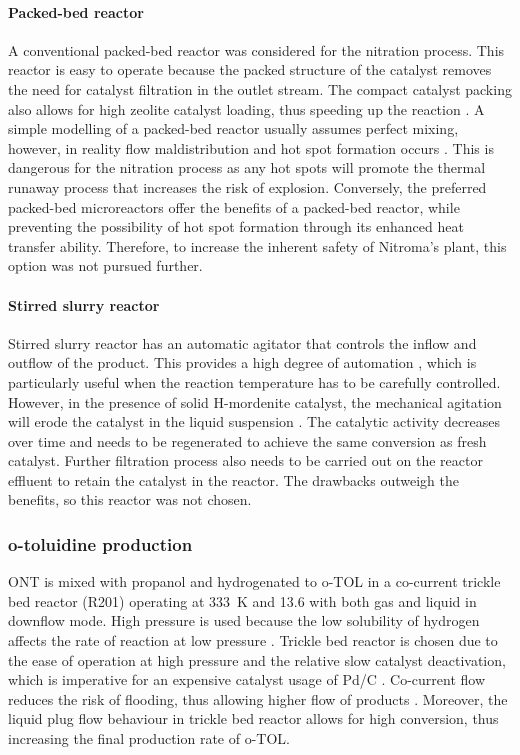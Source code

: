 \paragraph{Packed-bed reactor}
A conventional packed-bed reactor was considered for the nitration process. This reactor is easy to operate because the packed structure of the catalyst removes the need for catalyst filtration in the outlet stream. The compact catalyst packing also allows for high zeolite catalyst loading, thus speeding up the reaction \cite{kashid_microstructured_2009}. A simple modelling of a packed-bed reactor usually assumes perfect mixing, however, in reality flow maldistribution and hot spot formation occurs \cite{nguyen_flow_1994}. This is dangerous for the nitration process as any hot spots will promote the thermal runaway process that increases the risk of explosion. Conversely, the preferred packed-bed microreactors offer the benefits of a packed-bed reactor, while preventing the possibility of hot spot formation through its enhanced heat transfer ability. Therefore, to increase the inherent safety of Nitroma's plant, this option was not pursued further.

\paragraph{Stirred slurry reactor}
Stirred slurry reactor has an automatic agitator that controls the inflow and outflow of the product. This provides a high degree of automation \cite{liu_nitration_2019}, which is particularly useful when the reaction temperature has to be carefully controlled. However, in the presence of solid H-mordenite catalyst, the mechanical agitation will erode the catalyst in the liquid suspension \cite{argyle_heterogeneous_2015}. The catalytic activity decreases over time and needs to be regenerated to achieve the same conversion as fresh catalyst. Further filtration process also needs to be carried out on the reactor effluent to retain the catalyst in the reactor. The drawbacks outweigh the benefits, so this reactor was not chosen.


\subsubsection{o-toluidine production}

ONT is mixed with propanol and hydrogenated to o-TOL in a co-current trickle bed reactor (R201) operating at \SI{333}{\K} and \SI{13.6}{\atm} with both gas and liquid in downflow mode. High pressure is used because the low solubility of hydrogen affects the rate of reaction at low pressure \cite{rajadhyaksha_solvent_1986}. Trickle bed reactor is chosen due to the ease of operation at high pressure and the relative slow catalyst deactivation, which is imperative for an expensive catalyst usage of Pd/C \cite{vemala_hydrodynamic_nodate}. Co-current flow reduces the risk of flooding, thus allowing higher flow of products \cite{vemala_hydrodynamic_nodate}. Moreover, the liquid plug flow behaviour in trickle bed reactor allows for high conversion, thus increasing the final production rate of o-TOL. 

